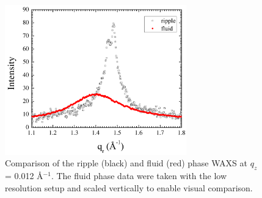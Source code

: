 \begin{figure}[htbp]
  \centering
  \includegraphics[width=0.7\textwidth]{figures/ripple/nGIWAXS/fluid_vs_ripple}
  \caption{Comparison of the ripple (black) and fluid (red) phase WAXS at $q_z$ = 0.012 \AA$^{-1}$.
  The fluid phase data were taken with the low resolution setup and scaled 
  vertically to enable visual comparison.}
  \label{fig:fluid_vs_ripple}
\end{figure}





\newpage
